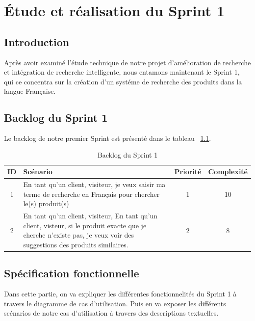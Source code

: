 \chapter{Étude et réalisation du Sprint 1}
\localtableofcontents
\section{Introduction}
\noindent
Après avoir examiné l'étude technique de notre projet d'amélioration de recherche et intégration de recherche intelligente, nous entamons maintenant le Sprint 1, qui ce concentra sur la création d'un systéme de recherche des produits dans la langue Française.

\section{Backlog du Sprint 1}
\noindent
Le backlog de notre premier Sprint est présenté dans le tableau ~\ref{tab:sprint1}.

\begin{table}[H]
	\centering

	\begin{tabularx}{\textwidth}{|c|X|c|c|}
		\hline
		\rowcolor{blue!20}
		\textbf{ID} & \textbf{Scénario}                                                                                                                                                      & \textbf{Priorité} & \textbf{Complexité} \\ \hline
		1           & En tant qu'un client, visiteur, je veux saisir ma terme de recherche en Français pour chercher le(s) produit(s)                                                        & 1                 & 10                  \\ \hline
		2           & En tant qu'un client, visiteur, En tant qu'un client, visteur, si le produit exacte que je cherche n'existe pas, je veux voir des suggestions des produits similaires. & 2                 & 8                   \\ \hline
	\end{tabularx}
	\caption{Backlog du Sprint 1}
	\label{tab:sprint1}
\end{table}

\section{Spécification fonctionnelle}
\noindent
Dans cette partie, on va expliquer les différentes fonctionnelités du Sprint 1 à travers le diagramme de cas d'utilisation. Puis en va exposer les différents scénarios de notre cas d'utilisation à travers des descriptions textuelles.

